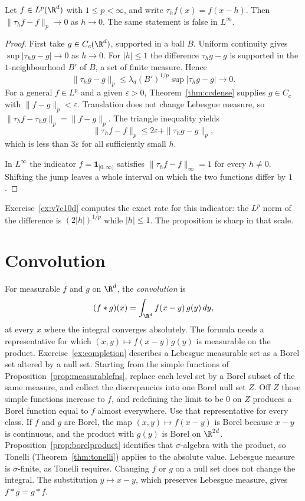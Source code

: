 \begin{proposition}\label{prop:translation}
Let $f\in L^p(\R^d)$ with $1\le p<\infty$, and write $\tau_hf(x)=f(x-h)$. Then $\|\tau_hf-f\|_p\to0$ as $h\to0$. The same statement is false in $L^\infty$.
\end{proposition}
\begin{proof}
First take $g\in C_c(\R^d)$, supported in a ball $B$. Uniform continuity gives $\sup|\tau_hg-g|\to0$ as $h\to0$. For $|h|\le1$ the difference $\tau_hg-g$ is supported in the $1$-neighbourhood $B'$ of $B$, a set of finite measure. Hence
\[\|\tau_hg-g\|_p\le\lambda_d(B')^{1/p}\sup|\tau_hg-g|\to0.\]
For a general $f\in L^p$ and a given $\varepsilon>0$, Theorem~\ref{thm:ccdense} supplies $g\in C_c$ with $\|f-g\|_p<\varepsilon$. Translation does not change Lebesgue measure, so $\|\tau_hf-\tau_hg\|_p=\|f-g\|_p$. The triangle inequality yields
\[\|\tau_hf-f\|_p\le2\varepsilon+\|\tau_hg-g\|_p,\]
which is less than $3\varepsilon$ for all sufficiently small $h$.

In $L^\infty$ the indicator $f=\mathbf 1_{[0,\infty)}$ satisfies $\|\tau_hf-f\|_\infty=1$ for every $h\ne0$. Shifting the jump leaves a whole interval on which the two functions differ by $1$.
\end{proof}

Exercise~\ref{ex:v7c10d} computes the exact rate for this indicator: the $L^p$ norm of the difference is $(2|h|)^{1/p}$ while $|h|\le1$. The proposition is sharp in that scale.

\section{Convolution}

For measurable $f$ and $g$ on $\R^d$, the \emph{convolution} is
\[(f*g)(x)=\int_{\R^d}f(x-y)\,g(y)\,dy,\]
at every $x$ where the integral converges absolutely. The formula needs a representative for which $(x,y)\mapsto f(x-y)g(y)$ is measurable on the product. Exercise~\ref{ex:completion} describes a Lebesgue measurable set as a Borel set altered by a null set. Starting from the simple functions of Proposition~\ref{prop:measurablefns}, replace each level set by a Borel subset of the same measure, and collect the discrepancies into one Borel null set $Z$. Off $Z$ those simple functions increase to $f$, and redefining the limit to be $0$ on $Z$ produces a Borel function equal to $f$ almost everywhere. Use that representative for every class. If $f$ and $g$ are Borel, the map $(x,y)\mapsto f(x-y)$ is Borel because $x-y$ is continuous, and the product with $g(y)$ is Borel on $\R^{2d}$. Proposition~\ref{prop:borelproduct} identifies that $\sigma$-algebra with the product, so Tonelli (Theorem~\ref{thm:tonelli}) applies to the absolute value. Lebesgue measure is $\sigma$-finite, as Tonelli requires. Changing $f$ or $g$ on a null set does not change the integral. The substitution $y\mapsto x-y$, which preserves Lebesgue measure, gives $f*g=g*f$.


